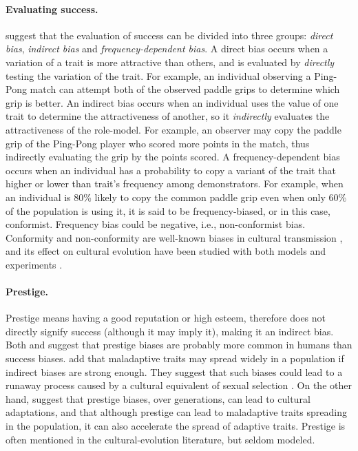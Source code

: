 \documentclass[12pt]{extarticle}
\begin{document}
\paragraph{Evaluating success.}
\citet[Ch. 5]{evolutionBook} suggest that the evaluation of success can be divided into three groups: \textit{direct bias}, \textit{indirect bias} and \textit{frequency-dependent bias}.
A direct bias occurs when a variation of a trait is more attractive than others, and is evaluated by \textit{directly} testing the variation of the trait.
For example, an individual observing a Ping-Pong match can attempt both of the observed paddle grips to determine which grip is better.
An indirect bias occurs when an individual uses the value of one trait to determine the attractiveness of another, so it \textit{indirectly} evaluates the attractiveness of the role-model.
For example, an observer may copy the paddle grip of the Ping-Pong player who scored more points in the match, thus indirectly evaluating the grip by the points scored.
A frequency-dependent bias occurs when an individual has a probability to copy a variant of the trait that higher or lower than trait's frequency among demonstrators. 
For example, when an individual is 80\% likely to copy the common paddle grip even when only 60\% of the population is using it, it is said to be frequency-biased, or in this case, conformist.
Frequency bias could be negative, i.e., non-conformist bias. 
Conformity and non-conformity are well-known biases in cultural transmission \citep{conformism}, and its effect on cultural evolution have been studied with both models \citep{conformity,anticonformity} and experiments \citep{negativeFrequency}.
 
\paragraph{Prestige.}
Prestige means having a good reputation or high esteem, therefore does not directly signify success (although it may imply it), making it an indirect bias.
Both \citet[Ch. 8]{evolutionBook} and \citet{complexityPaper} suggest that prestige biases are probably more common in humans than success biases.
\citet[Ch. 8]{evolutionBook} add that maladaptive traits may spread widely in a population if indirect biases are strong enough.
They suggest that such biases could lead to a runaway process caused by a cultural equivalent of sexual selection \citep{sexualSelectionBook}.
On the other hand, \citet{fijian_social_bias} suggest that prestige biases, over generations, can lead to cultural adaptations, and that although prestige can lead to maladaptive traits spreading in the population, it can also accelerate the spread of adaptive traits.
Prestige is often mentioned in the cultural-evolution literature, but seldom modeled.
\end{document}
